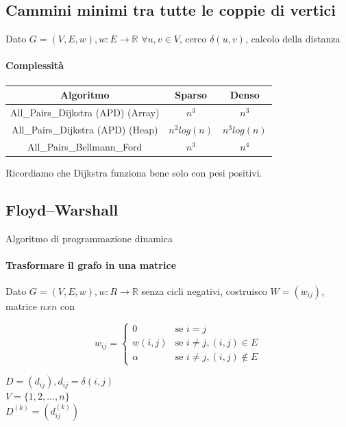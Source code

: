\documentclass[tikz]{article}
\let\oldparagraph\paragraph
\renewcommand{\paragraph}[1]{\oldparagraph{#1}\mbox{}}
\begin{document}
{{\subsection{Cammini minimi tra tutte le coppie di vertici}

Dato $G=(V,E,w), w: E \rightarrow \mathbb{R}$
$\forall u,v \in V$, cerco $\delta(u,v)$, calcolo della distanza




\paragraph{Complessità}

\begin{tabular}{|c|c|c|}
\hline 
Algoritmo & Sparso & Denso \\ 
\hline 
All\_Pairs\_Dijkstra (APD) (Array) & $n^3$ & $n^3$ \\ 
\hline 
All\_Pairs\_Dijkstra (APD) (Heap) & $n^2log(n)$ & $n^3log(n)$ \\ 
\hline 
All\_Pairs\_Bellmann\_Ford & $n^3$ & $n^4$ \\ 
\hline 
\end{tabular} 

Ricordiamo che Dijkstra funziona bene solo con pesi positivi.

\subsection{Floyd–Warshall}

Algoritmo di programmazione dinamica

\paragraph{Trasformare il grafo in una matrice}

Dato $G=(V,E,w), w : R \rightarrow \mathbb{R}$ senza cicli negativi, costruisco $W=(w_{ij})$, matrice $nxn$ con

\begin{equation}
w_{ij} = 
\begin{cases}
0 & \mbox{se } i=j \\ 
w(i,j) & \mbox{se } i\neq j, (i,j) \in E \\ 
\alpha & \mbox{se } i\neq j, (i,j) \notin E
\end{cases}
\end{equation}

$D=(d_{ij}), d_{ij} = \delta(i,j)$ \\ 
$V=\{1,2,\ldots,n\}$ \\ 
$D^{(k)} = (d_{ij}^{(k)})$ 


}}
\end{document}
